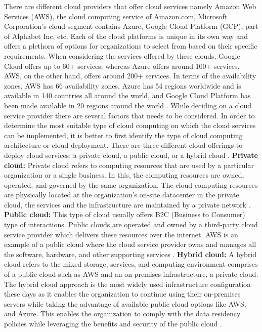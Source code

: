 \par There are different cloud providers that offer cloud services namely Amazon Web Services (AWS), the cloud computing service of Amazon.com, Microsoft Corporation’s cloud segment contains Azure, Google Cloud Platform (GCP), part of Alphabet Inc, etc.
Each of the cloud platforms is unique in its own way and offers a plethora of options for organizations to select from based on their specific requirements.
When considering the services offered by these clouds,
Google Cloud offers up to 60+ services, whereas Azure
offers around 100+ services.
AWS, on the other hand, offers around 200+ services.
In terms of the availability zones, AWS has 66 availability zones, Azure has 54 regions worldwide and is available in 140 countries all around the world, and Google Cloud Platform has been made available in 20 regions around the world \cite{13}.
While deciding on a cloud service provider there are
several factors that needs to be considered.
In order to determine the most suitable type of cloud computing on which the cloud services can be implemented, it is better to first identify the type of cloud computing architecture or cloud deployment.
There are three different cloud offerings to deploy cloud services: a private cloud, a public cloud, or a hybrid cloud \cite{14}.
\hfill \break
\textbf{Private cloud:}
Private cloud refers to computing resources that are used by a particular organization or a single business.
In this,
the computing resources are owned, operated, and governed by the same organization.
The cloud
computing resources are physically located at the
organization’s on-site datacenter in the private cloud, the
services
and
the
infrastructure are maintained by a private network \cite{14}.
\hfill \break
\textbf{Public cloud:}
This type of cloud usually offers B2C (Business to Consumer) type of interactions. Public clouds are operated and
owned by a third-party cloud service provider which delivers these resources over the internet. AWS is an example of
a public cloud where the cloud service provider owns and manages all the software, hardware, and other supporting
services \cite{14}.
\hfill \break
\textbf{Hybrid cloud:}
A hybrid cloud refers to the mixed storage, services, and computing environment comprises of a public cloud such as
AWS and an on-premises infrastructure, a private cloud. The hybrid cloud approach is the most widely used infrastructure configuration these days as it enables the organization
to continue using their on-premises servers while taking the advantage of available public cloud options like AWS,
and Azure. This enables the organization to comply with the data residency policies while leveraging the benefits and
security of the public cloud \cite{14}.


